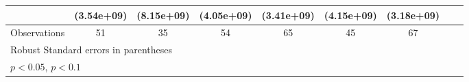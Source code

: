 \begin{table}[htbp]
\begin{tabular}{l*{8}{c}}
                    &  (3.54e+09)         &  (8.15e+09)         &  (4.05e+09)         &  (3.41e+09)         &  (4.15e+09)         &  (3.18e+09)         \\
\hline
Observations        &          51         &          35         &          54         &          65         &          45         &          67         \\
\hline\hline\hline \multicolumn{5}{l}{\footnotesize Robust Standard errors in parentheses}\\\multicolumn{2}{l}{\footnotesize \sym{**} \(p<0.05\), \sym{*} \(p<0.1\)}\\ \end{tabular} \\ \end{table}
